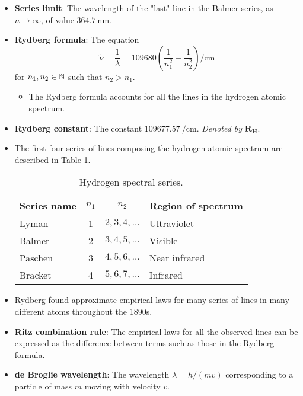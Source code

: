 \documentclass[../notes.tex]{subfiles}
\begin{document}
\begin{itemize}
    \item \textbf{Series limit}: The wavelength of the "last" line in the Balmer series, as $n\to\infty$, of value $\SI{364.7}{\nano\meter}$.
    \item \textbf{Rydberg formula}: The equation
    \begin{equation*}
        \tilde{\nu} = \frac{1}{\lambda} = \num{109680}\left( \frac{1}{n_1^2}-\frac{1}{n_2^2} \right)\si{\per\centi\meter}
    \end{equation*}
    for $n_1,n_2\in\mathbb{N}$ such that $n_2>n_1$.
    \begin{itemize}
        \item The Rydberg formula accounts for all the lines in the hydrogen atomic spectrum.
    \end{itemize}
    \item \textbf{Rydberg constant}: The constant $\SI{109677.57}{\per\centi\meter}$. \emph{Denoted by} $\bm{R_H}$.
    \item The first four series of lines composing the hydrogen atomic spectrum are described in Table \ref{tab:spectralSeriesH}.
    \begin{table}[h!]
        \centering
        \renewcommand{\arraystretch}{1.4}
        \small
        \begin{tabular}{lccl}
            \toprule
            Series name & $n_1$ & $n_2$ & Region of spectrum\\
            \hline
            Lyman   & 1 & $2,3,4,\dots$ & Ultraviolet\\
            Balmer  & 2 & $3,4,5,\dots$ & Visible\\
            Paschen & 3 & $4,5,6,\dots$ & Near infrared\\
            Bracket & 4 & $5,6,7,\dots$ & Infrared\\
            \toprule
        \end{tabular}
        \caption{Hydrogen spectral series.}
        \label{tab:spectralSeriesH}
    \end{table}
    \item Rydberg found approximate empirical laws for many series of lines in many different atoms throughout the 1890s.
    \item \textbf{Ritz combination rule}: The empirical laws for all the observed lines can be expressed as the difference between terms such as those in the Rydberg formula.
    \item \textbf{de Broglie wavelength}: The wavelength $\lambda=h/(mv)$ corresponding to a particle of mass $m$ moving with velocity $v$.

\end{itemize}
\end{document}
